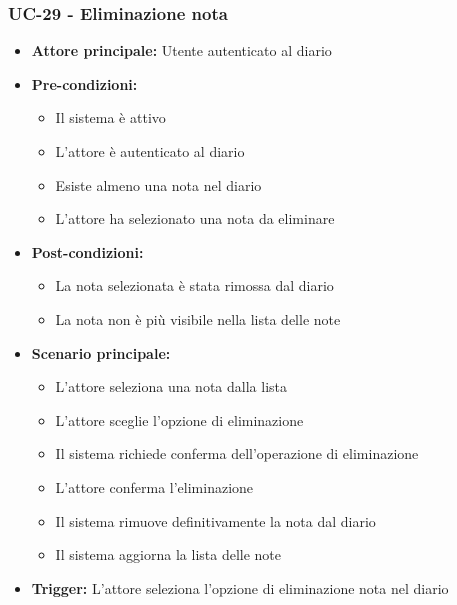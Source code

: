 \documentclass[a4paper,12pt]{article}
\begin{document}
\subsubsection{UC-29 - Eliminazione nota} \label{subsec:UC-29}
\begin{itemize}
    \item \textbf{Attore principale:} Utente autenticato al diario
    \item \textbf{Pre-condizioni:}
    \begin{itemize}
        \item Il sistema è attivo
        \item L'attore è autenticato al diario
        \item Esiste almeno una nota nel diario
        \item L'attore ha selezionato una nota da eliminare
    \end{itemize}
    \item \textbf{Post-condizioni:} 
    \begin{itemize}
        \item La nota selezionata è stata rimossa dal diario
        \item La nota non è più visibile nella lista delle note
    \end{itemize}
    \item \textbf{Scenario principale:} 
    \begin{itemize}
        \item L'attore seleziona una nota dalla lista
        \item L'attore sceglie l'opzione di eliminazione
        \item Il sistema richiede conferma dell'operazione di eliminazione
        \item L'attore conferma l'eliminazione
        \item Il sistema rimuove definitivamente la nota dal diario
        \item Il sistema aggiorna la lista delle note
    \end{itemize}
    \item \textbf{Trigger:} L'attore seleziona l'opzione di eliminazione nota nel diario
\end{itemize}
\end{document}
